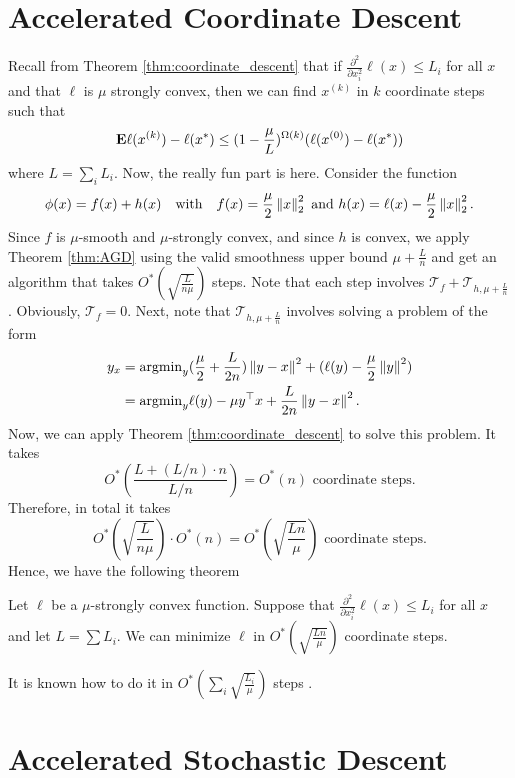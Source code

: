 \section{Accelerated Coordinate Descent}

Recall from Theorem \ref{thm:coordinate_descent} that if $\frac{\partial^{2}}{\partial x^{2}_{i}}\ell(x)\leq L_{i}$
for all $x$ and that $\ell$ is $\mu$ strongly convex, then we can
find $x^{(k)}$ in $k$ coordinate steps such that 
\[
\mathbf{E}\ell(x^{(k)})-\ell(x^{*})\leq(1-\frac{\mu}{L})^{\Omega(k)}(\ell(x^{(0)})-\ell(x^{*}))
\]
where $L=\sum_{i}L_{i}$. Now, the really fun part is here. Consider
the function 
\[
\phi(x)=f(x)+h(x)\quad\text{with}\quad f(x)=\frac{\mu}{2}\left\Vert x\right\Vert^{2}_{2}\text{ and }h(x)=\ell(x)-\frac{\mu}{2}\left\Vert x\right\Vert^{2}_{2}.
\]
Since $f$ is $\mu$-smooth and $\mu$-strongly convex, and since
$h$ is convex, we apply Theorem \ref{thm:AGD} using the valid smoothness
upper bound $\mu+\frac{L}{n}$ and get an algorithm that takes $O^{*}(\sqrt{\frac{L}{n\mu}})$
steps. Note that each step involves $\mathcal{T}_{f}+\mathcal{T}_{h,\mu+\frac{L}{n}}$.
Obviously, $\mathcal{T}_{f}=0$. Next, note that $\mathcal{T}_{h,\mu+\frac{L}{n}}$
involves solving a problem of the form
\begin{align*}
y_{x} & =\mathrm{argmin}_{y}(\frac{\mu}{2}+\frac{L}{2n})\left\Vert y-x\right\Vert^{2}+(\ell(y)-\frac{\mu}{2}\left\Vert y\right\Vert^{2})\\
 & =\mathrm{argmin}_{y}\ell(y)-\mu y^{\top}x+\frac{L}{2n}\left\Vert y-x\right\Vert^{2}.
\end{align*}
Now, we can apply Theorem \ref{thm:coordinate_descent} to solve this
problem. It takes 
\[
O^{*}(\frac{L+(L/n)\cdot n}{L/n})=O^{*}(n)\text{ coordinate steps.}
\]
Therefore, in total it takes
\[
O^{*}(\sqrt{\frac{L}{n\mu}})\cdot O^{*}(n)=O^{*}(\sqrt{\frac{Ln}{\mu}})\text{ coordinate steps}.
\]
Hence, we have the following theorem
\begin{thm}
\label{thm:coordinate_descent_linear_acc}Let $\ell$ be a $\mu$-strongly
convex function. Suppose that $\frac{\partial^{2}}{\partial x^{2}_{i}}\ell(x)\leq L_{i}$
for all $x$ and let $L=\sum L_{i}$. We can minimize $\ell$ in \textup{$O^{*}(\sqrt{\frac{Ln}{\mu}})$
coordinate steps.}
\end{thm}

\begin{rem}
It is known how to do it in $O^{*}(\sum_{i}\sqrt{\frac{L_{i}}{\mu}})$
steps \cite{allen2016even}.
\end{rem}


\section{Accelerated Stochastic Descent}


